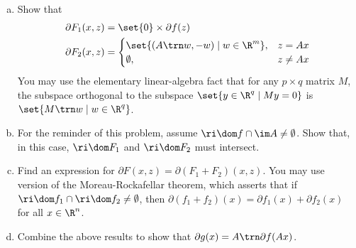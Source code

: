\documentclass{article}
\theoremstyle{plain}
\theoremstyle{definition}
\theoremstyle{remark}
\begin{document}
\begin{problem}
\begin{enumerate}[(a)]
{\begin{align*}
\begin{cases}
                    f(z), & z=Ax \\
                    +\infty, & z\neq Ax
                \end{cases}
            \end{align*}
        }
        Show that $F_1$, $F_2$ and $F$ defined in this manner are convex and that $d\in\partial g(x)$ implies $(d,0)\in\partial F(x,Ax)$.
        \item Show that {
            \begin{align*}
                \partial F_1(x,z) &= \set{0}\times\partial f(z) \\
                \partial F_2(x,z) &= \begin{cases}
                    \set{(A\trn w,-w)\mid w\in\R^m}, & z=Ax \\
                    \emptyset, & z\neq Ax
                \end{cases}
            \end{align*}
        }
        You may use the elementary linear-algebra fact that for any $p\times q$ matrix $M$, the subspace orthogonal to the subspace $\set{y\in\R^q\mid My=0}$ is $\set{M\trn w\mid w\in\R^q}$.
        \item For the reminder of this problem, assume $\ri\dom f \cap \im A\neq\emptyset$. Show that, in this case, $\ri\dom F_1$ and $\ri \dom F_2$ must intersect.
        \item Find an expression for $\partial F(x,z)=\partial(F_1+F_2)(x,z).$ You may use version of the Moreau-Rockafellar theorem, which asserts that if $\ri\dom f_1\cap\ri\dom f_2\neq\emptyset$, then $\partial(f_1+f_2)(x)=\partial f_1(x)+\partial f_2(x)$ for all $x\in\R^n$.
        \item Combine the above results to show that $\partial g(x)=A\trn\partial f(Ax)$.
    \end{enumerate}
\end{problem}
\end{document}
